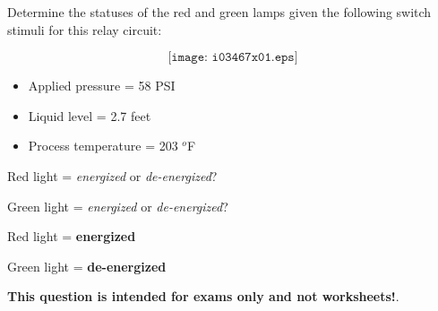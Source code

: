 

Determine the statuses of the red and green lamps given the following switch stimuli for this relay circuit:

$$\texttt{[image: i03467x01.eps]}$$

\begin{itemize}
\item{} Applied pressure = 58 PSI
\item{} Liquid level = 2.7 feet
\item{} Process temperature = 203 $^{o}$F
\end{itemize}

\vskip 10pt

Red light = {\it energized} or {\it de-energized}?

\vskip 10pt

Green light = {\it energized} or {\it de-energized}?







Red light = {\bf energized}

Green light = {\bf de-energized}







{\bf This question is intended for exams only and not worksheets!}.


